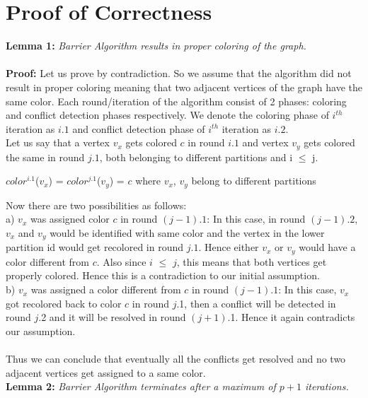 \documentclass[a4paper,11pt]{article}
\begin{document}
\section{Proof of Correctness}
\textbf{Lemma 1:} \textit{Barrier Algorithm results in proper coloring of the graph.}\\\\
\textbf{Proof:} Let us prove by contradiction. So we assume that the algorithm did not result in proper coloring meaning that two adjacent vertices of the graph have the same color. Each round/iteration of the algorithm consist of 2 phases: coloring and conflict detection phases respectively. We denote the coloring phase of $i^{th}$ iteration as $i.1$ and conflict detection phase of $i^{th}$ iteration as $i.2$.\\
\newline
Let us say that a vertex $v_x$ gets colored $c$ in round $i.1$ and vertex $v_y$ gets colored the same in round $j.1$, both belonging to different partitions and i $\leq$ j.\\
\begin{center}
$color^{i.1}$($v_x$) = $color^{j.1}$($v_y$) = $c$ where $v_x$, $v_y$ belong to different partitions
\end{center}
Now there are two possibilities as follows:\\
\newline
a) $v_x$ was assigned color $c$ in round $(j-1).1$: In this case, in round $(j-1).2$, $v_x$ and $v_y$ would be identified with same color and the vertex in the lower partition id would get recolored in round $j.1$. Hence either $v_x$ or $v_y$ would have a color different from $c$. Also since $i$ $\leq$ $j$, this means that both vertices get properly colored. Hence this is a contradiction to our initial assumption.\\
\newline
b) $v_x$ was assigned a color different from $c$ in round $(j-1).1$: In this case, $v_x$ got recolored back to color $c$ in round $j$.1, then a conflict will be detected in round $j$.2 and it will be resolved in round $(j+1)$.1. Hence it again contradicts our assumption.\\
\\Thus we can conclude that eventually all the conflicts get resolved and no two adjacent vertices get assigned to a same color.\\
\newline
\textbf{Lemma 2:} \textit{Barrier Algorithm terminates after a maximum of $p+1$ iterations.}\\\\
\end{document}
